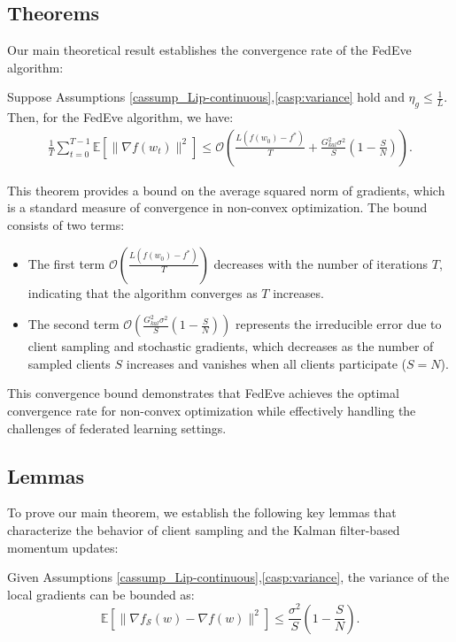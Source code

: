 \subsection{Theorems}
Our main theoretical result establishes the convergence rate of the FedEve algorithm:

\begin{theorem} \label{thm_convergence-FedEve}
    Suppose Assumptions \ref{cassump_Lip-continuous},\ref{casp:variance} hold and \(\eta_g \le \frac{1}{L}\). Then, for the FedEve algorithm, we have:
    \begin{align*}    
        \frac{1}{T} \sum_{t=0}^{T-1} \mathbb{E}[\|\nabla f(w_t)\|^2] \le \mathcal{O}\left(\frac{L(f(w_0) - f^*)}{T} + \frac{G_{kal}^2 \sigma^2}{S} \left(1 - \frac{S}{N}\right)\right).
    \end{align*}
\end{theorem}

This theorem provides a bound on the average squared norm of gradients, which is a standard measure of convergence in non-convex optimization. The bound consists of two terms:
\begin{itemize}
    \item The first term \(\mathcal{O}\left(\frac{L(f(w_0) - f^*)}{T}\right)\) decreases with the number of iterations \(T\), indicating that the algorithm converges as \(T\) increases.
    \item The second term \(\mathcal{O}\left(\frac{G_{kal}^2 \sigma^2}{S} \left(1 - \frac{S}{N}\right)\right)\) represents the irreducible error due to client sampling and stochastic gradients, which decreases as the number of sampled clients \(S\) increases and vanishes when all clients participate (\(S = N\)).
\end{itemize}

This convergence bound demonstrates that FedEve achieves the optimal convergence rate for non-convex optimization while effectively handling the challenges of federated learning settings.

\subsection{Lemmas}
To prove our main theorem, we establish the following key lemmas that characterize the behavior of client sampling and the Kalman filter-based momentum updates:

\begin{lemma} \label{lem:variance-local-gradients}
    Given Assumptions \ref{cassump_Lip-continuous},\ref{casp:variance}, the variance of the local gradients can be bounded as:
    \[
        \mathbb{E}[\|\nabla f_{\mathcal{S}}(w) - \nabla f(w)\|^2] \leq \frac{\sigma^2}{S} \left(1 - \frac{S}{N}\right).
    \]
\end{lemma}

